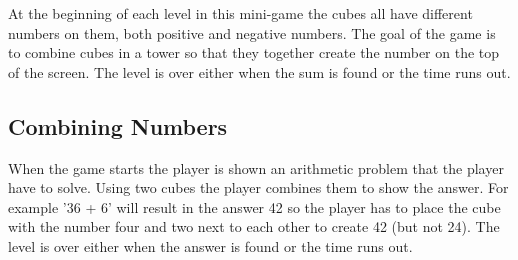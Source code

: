At the beginning of each level in this mini-game the cubes all have different numbers on them, both positive and negative numbers. The goal of the game is to combine cubes in a tower so that they together create the number on the top of the screen.
The level is over either when the sum is found or the time runs out.



\subsection{Combining Numbers}
	\label{game:combining_numbers}

When the game starts the player is shown an arithmetic problem that the player have to solve. Using two cubes the player combines them to show the answer. For example '36 + 6' will result in the answer 42 so the player has to place the cube with the number four and two next to each other to create 42 (but not 24).
The level is over either when the answer is found or the time runs out.

